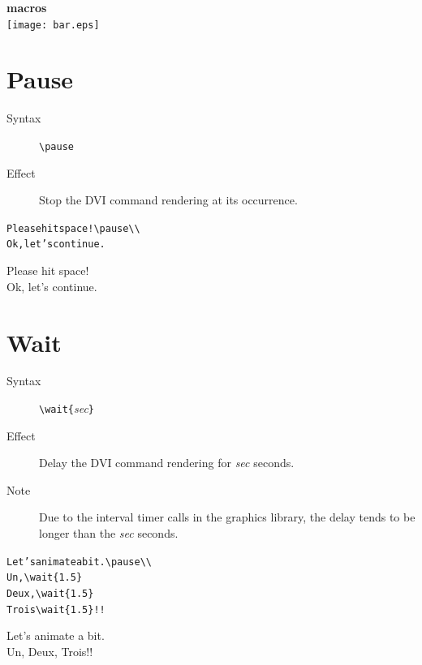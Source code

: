 \documentclass{article}
\begin{document}
\noindent
{\bf\Large {\ActiveDVI} macros}\\

\noindent
\texttt{[image: bar.eps]}

\section{Pause}

\begin{description}
\item[Syntax]  \verb!\pause!
\item[Effect] Stop the DVI command rendering at its occurrence.
\end{description}

\begin{minipage}[t]{0.5\textwidth}
\begin{alltt}
Please hit space!{\color{blue}\verb!\!pause}\verb!\\!
Ok, let's continue.
\end{alltt}
\end{minipage}
\begin{minipage}[t]{0.5\textwidth}
Please hit space!\\ \pause Ok, let's continue.
\end{minipage}

\section{Wait}

\begin{description}
\item[Syntax]  \verb!\wait{!{\em{sec}}\verb!}!
\item[Effect] Delay the DVI command rendering for {\em{sec}} seconds.
\item[Note] Due to the interval timer calls in the graphics library,
  the delay tends to be longer than the {\em{sec}} seconds.
\end{description}

\begin{minipage}[t]{0.5\textwidth}
\begin{alltt}
Let's animate a bit.\verb!\pause\\!
Un,{\color{blue}\verb!\wait{1.5}!}
Deux,{\color{blue}\verb!\wait{1.5}!}
Trois{\color{blue}\verb!\wait{1.5}!}!! 
\end{alltt}
\end{minipage}
\begin{minipage}[t]{0.5\textwidth}
Let's animate a bit.\pause\\
Un,
Deux,
Trois!! 
\end{minipage}
\end{document}
